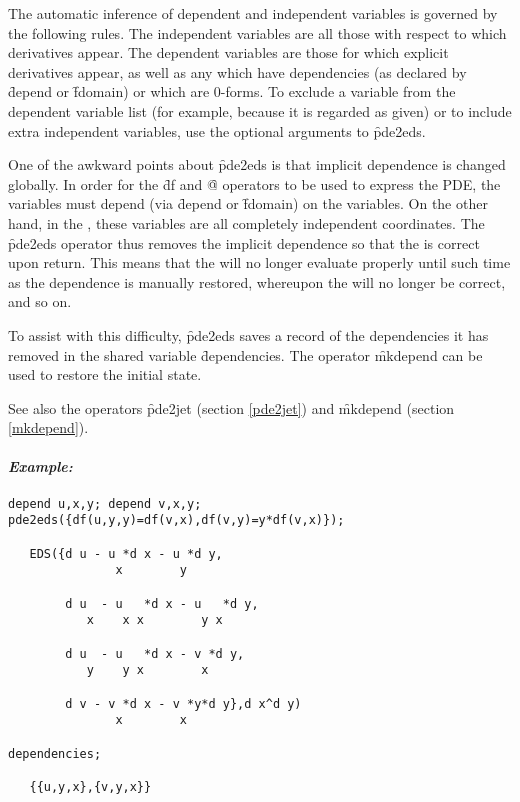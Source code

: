 The automatic inference of dependent and independent variables is governed
by the following rules. The independent variables are all those with
respect to which derivatives appear. The dependent variables are those
for which explicit derivatives appear, as well as any which have
dependencies (as declared by \f{depend} or \f{fdomain}) or which are 0-forms.
To exclude a variable from the dependent variable list (for example,
because it is regarded as given) or to include extra independent variables,
use the optional arguments to \f{pde2eds}.

One of the awkward points about \f{pde2eds} is that implicit dependence
is changed globally. In order for the \f{df} and \f{@} operators to be used
to express the PDE, the  variables must depend (via
\f{depend} or \f{fdomain}) on the  variables. On the
other hand, in the , these variables are all completely
independent coordinates. The \f{pde2eds} operator thus removes the implicit
dependence so that the  is correct upon return. This means that
the  will no longer evaluate properly until such time as the
dependence is manually restored, whereupon the  will no longer be
correct, and so on.

To assist with this difficulty, \f{pde2eds} saves a record of the
dependencies it has removed in the shared variable \f{dependencies}. The
operator \f{mkdepend} can be used to restore the initial state.

See also the operators \f{pde2jet} (section \ref{pde2jet}) and \f{mkdepend}
(section \ref{mkdepend}).

\paragraph{\it Example:}
\begin{verbatim}
depend u,x,y; depend v,x,y;
pde2eds({df(u,y,y)=df(v,x),df(v,y)=y*df(v,x)});

   EDS({d u - u *d x - u *d y,
               x        y

        d u  - u   *d x - u   *d y,
           x    x x        y x

        d u  - u   *d x - v *d y,
           y    y x        x

        d v - v *d x - v *y*d y},d x^d y)
               x        x

dependencies;

   {{u,y,x},{v,y,x}}
\end{verbatim}

